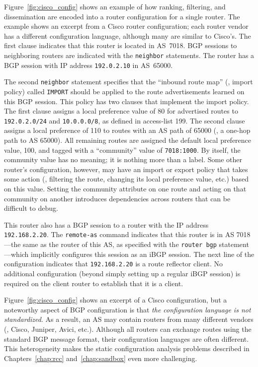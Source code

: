 Figure~\ref{fig:cisco_config} shows an example of how ranking,
filtering, and dissemination are
encoded into a router configuration for a single router. The example
shows an excerpt from a Cisco router configuration; each router vendor
has a different configuration language, although many are similar to
Cisco's.  The first clause indicates that this router is located in
AS~7018.  BGP sessions to neighboring routers are indicated with the
{\tt neighbor} statements.  The router has a BGP session with IP address
{\tt 192.0.2.10} in AS~65000.  

The second {\tt neighbor} statement specifies that the ``inbound route
map'' (\ie, import policy) called {\tt IMPORT} should be applied to the
route advertisements learned on this BGP session.  This policy has two
clauses that implement the import policy.  The first clause assigns a
local preference value of 80 for advertised routes to {\tt 192.0.2.0/24}
and {\tt 10.0.0.0/8}, as defined in access-list 199.  The second clause
assigns a local preference of 110 to routes with an AS path of 65000
(\ie, a one-hop path to AS 65000).  All remaining routes are assigned
the default local preference value, 100, and tagged with a ``community''
value of {\tt 7018:1000}.  By itself, the community value has no
meaning; it is nothing more than a label.  Some other router's
configuration, however, may have an import or export policy that takes
some action (\eg, filtering the route, changing its local preference
value, etc.) based on this value.  Setting the community attribute on
one route and acting on that community on another introduces
dependencies across routers that can be difficult to debug.

This router also has a BGP session to a router with the IP address
{\tt 192.168.2.20}. The {\tt remote-as} command indicates that this
router is in AS 7018---the same as the router of this AS, as specified with
the {\tt router bgp} statement---which implicitly configures this
session as an iBGP session.  The next line of the configuration
indicates that {\tt 192.168.2.20} is a route reflector client.  No
additional configuration (beyond simply setting up a regular iBGP
session) is required on the client router to establish that it is a
client.

Figure~\ref{fig:cisco_config} shows an excerpt of a Cisco configuration,
but a noteworthy aspect of BGP configuration is that {\em the
configuration language is not standardized}.  As a result, an AS may
contain routers from many different vendors (\eg, Cisco, Juniper, Avici,
etc.).  Although all routers can exchange routes using the standard
BGP message format, their configuration languages are often different.
This heterogeneity makes the static configuration analysis problems
described in Chapters~\ref{chap:rcc} and~\ref{chap:sandbox} even more
challenging.

